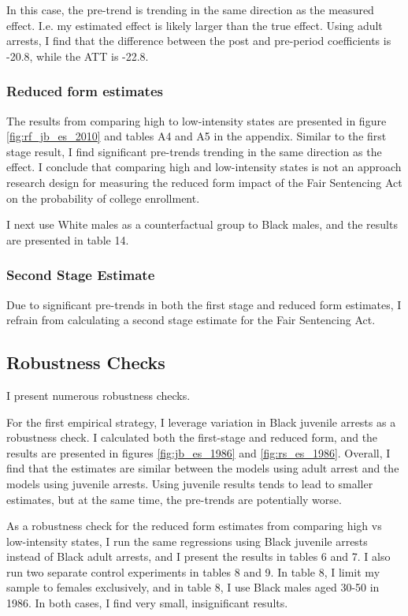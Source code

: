 \documentclass{article}
\begin{document}
In this case, the pre-trend is trending in the same direction as the measured effect. I.e. my estimated effect is likely larger than the true effect. Using adult arrests, I find that the difference between the post and pre-period coefficients is -20.8, while the ATT is -22.8.

\subsubsection{Reduced form estimates}

The results from comparing high to low-intensity states are presented in figure \ref{fig:rf_jb_es_2010} and tables A4 and A5 in the appendix. Similar to the first stage result, I find significant pre-trends trending in the same direction as the effect. I conclude that comparing high and low-intensity states is not an approach research design for measuring the reduced form impact of the Fair Sentencing Act on the probability of college enrollment. 

I next use White males as a counterfactual group to Black males, and the results are presented in table 14.

\subsubsection{Second Stage Estimate}

Due to significant pre-trends in both the first stage and reduced form estimates, I refrain from calculating a second stage estimate for the Fair Sentencing Act.

\subsection{Robustness Checks} %

I present numerous robustness checks. 

For the first empirical strategy, I leverage variation in Black juvenile arrests as a robustness check. I calculated both the first-stage and reduced form, and the results are presented in figures \ref{fig:jb_es_1986} and \ref{fig:rs_es_1986}. Overall, I find that the estimates are similar between the models using adult arrest and the models using juvenile arrests. Using juvenile results tends to lead to smaller estimates, but at the same time, the pre-trends are potentially worse. 

As a robustness check for the reduced form estimates from comparing high vs low-intensity states, I run the same regressions using Black juvenile arrests instead of Black adult arrests, and I present the results in tables 6 and 7.
I also run two separate control experiments in tables 8 and 9. In table 8, I limit my sample to females exclusively, and in table 8, I use Black males aged 30-50 in 1986. In both cases, I find very small, insignificant results.
\end{document}
